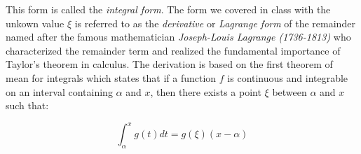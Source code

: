 \documentclass [titlepage,12pt,letter] {article}
\begin{document}
\noindent 
This form is called the {\it integral form}. The form we covered in
class with the unkown value $\xi$ is referred to as the {\it
  derivative} or {\it Lagrange form} of the remainder named after the
famous mathematician {\it Joseph-Louis Lagrange (1736-1813)} who
characterized the remainder term and realized the fundamental
importance of Taylor's theorem in calculus. The derivation is based on
the first theorem of mean for integrals which states that if a
function $f$ is continuous and integrable on an interval containing 
$\alpha$ and $x$, then there exists a point $\xi$ between $\alpha$
and $x$ such that: 

\begin{equation} 
\int_{\alpha}^{x} g(t)dt = g(\xi)(x-\alpha) 
\end{equation} 





 
 
\end{document}
